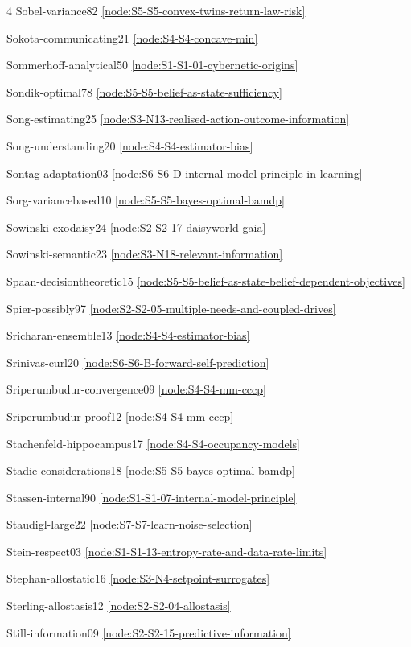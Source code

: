 \documentclass[10pt]{article}
\begin{document}
{\begin{multicols}{4}
Sobel-variance82 \hfill \ref{node:S5-S5-convex-twins-return-law-risk}\par
Sokota-communicating21 \hfill \ref{node:S4-S4-concave-min}\par
Sommerhoff-analytical50 \hfill \ref{node:S1-S1-01-cybernetic-origins}\par
Sondik-optimal78 \hfill \ref{node:S5-S5-belief-as-state-sufficiency}\par
Song-estimating25 \hfill \ref{node:S3-N13-realised-action-outcome-information}\par
Song-understanding20 \hfill \ref{node:S4-S4-estimator-bias}\par
Sontag-adaptation03 \hfill \ref{node:S6-S6-D-internal-model-principle-in-learning}\par
Sorg-variancebased10 \hfill \ref{node:S5-S5-bayes-optimal-bamdp}\par
Sowinski-exodaisy24 \hfill \ref{node:S2-S2-17-daisyworld-gaia}\par
Sowinski-semantic23 \hfill \ref{node:S3-N18-relevant-information}\par
Spaan-decisiontheoretic15 \hfill \ref{node:S5-S5-belief-as-state-belief-dependent-objectives}\par
Spier-possibly97 \hfill \ref{node:S2-S2-05-multiple-needs-and-coupled-drives}\par
Sricharan-ensemble13 \hfill \ref{node:S4-S4-estimator-bias}\par
Srinivas-curl20 \hfill \ref{node:S6-S6-B-forward-self-prediction}\par
Sriperumbudur-convergence09 \hfill \ref{node:S4-S4-mm-cccp}\par
Sriperumbudur-proof12 \hfill \ref{node:S4-S4-mm-cccp}\par
Stachenfeld-hippocampus17 \hfill \ref{node:S4-S4-occupancy-models}\par
Stadie-considerations18 \hfill \ref{node:S5-S5-bayes-optimal-bamdp}\par
Stassen-internal90 \hfill \ref{node:S1-S1-07-internal-model-principle}\par
Staudigl-large22 \hfill \ref{node:S7-S7-learn-noise-selection}\par
Stein-respect03 \hfill \ref{node:S1-S1-13-entropy-rate-and-data-rate-limits}\par
Stephan-allostatic16 \hfill \ref{node:S3-N4-setpoint-surrogates}\par
Sterling-allostasis12 \hfill \ref{node:S2-S2-04-allostasis}\par
Still-information09 \hfill \ref{node:S2-S2-15-predictive-information}\par

\end{multicols}}
\end{document}
